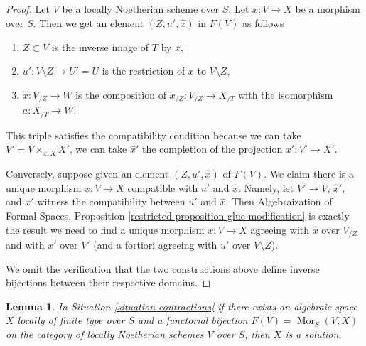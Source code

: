 \documentclass{stacks-project}
\theoremstyle{plain}
\newtheorem{lemma}[subsection]{Lemma}
\theoremstyle{definition}
\theoremstyle{remark}
\numberwithin{equation}{subsection}
\def\Mor{\mathop{\mathrm{Mor}}\nolimits}
\begin{document}
\begin{proof}
Let $V$ be a locally Noetherian scheme over $S$.
Let $x : V \to X$ be a morphism over $S$.
Then we get an element $(Z, u', \hat x)$ in $F(V)$ as follows
\begin{enumerate}
\item $Z \subset V$ is the inverse image of $T$ by $x$,
\item $u' : V \setminus Z \to U' = U$ is the restriction of
$x$ to $V \setminus Z$,
\item $\hat x : V_{/Z} \to W$ is the composition of
$x_{/Z} : V_{/Z} \to X_{/T}$ with the isomorphism $a : X_{/T} \to W$.
\end{enumerate}
This triple satisfies the compatibility condition because we
can take $V' = V \times_{x, X} X'$, we can take $\hat x'$
the completion of the projection $x' : V' \to X'$.

\medskip\noindent
Conversely, suppose given an element $(Z, u', \hat x)$ of $F(V)$. We claim
there is a unique morphism $x : V \to X$ compatible with $u'$ and $\hat x$.
Namely, let $V' \to V$, $\hat x'$, and $x'$ witness the
compatibility between $u'$ and $\hat x$. Then
Algebraization of Formal Spaces, Proposition
\ref{restricted-proposition-glue-modification}
is exactly the result we need to find
a unique morphism $x : V \to X$ agreeing with
$\hat x$ over $V_{/Z}$ and with $x'$ over $V'$ (and a fortiori
agreeing with $u'$ over $V \setminus Z$).

\medskip\noindent
We omit the verification that the two constructions above define inverse
bijections between their respective domains.
\end{proof}

\begin{lemma}
\label{lemma-functor-is-solution}
In Situation \ref{situation-contractions} if there exists an
algebraic space $X$ locally of finite type over $S$ and a
functorial bijection $F(V) = \Mor_S(V, X)$ on the category of
locally Noetherian schemes $V$ over $S$, then $X$ is a solution.
\end{lemma}
\end{document}
